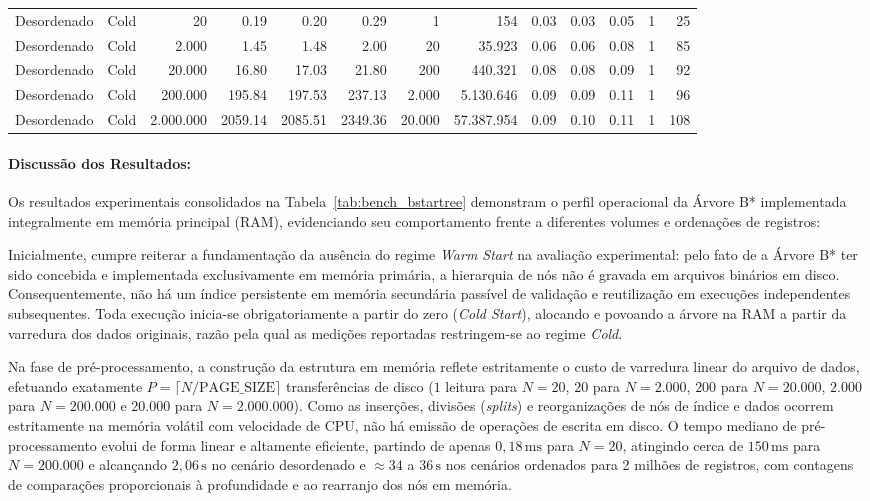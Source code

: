 \documentclass[12pt,a4paper]{article}
\begin{document}
\begin{table}[H]
{\begin{tabular}{llr rrr rr rrr rr}
\midrule
Desordenado & Cold & 20                &    0.19 &    0.20 &    0.29 &     1 &   154 &    0.03 &    0.03 &    0.05 &     1 &    25 \\
Desordenado & Cold & 2.000          &    1.45 &    1.48 &    2.00 &    20 & 35.923 &    0.06 &    0.06 &    0.08 &     1 &    85 \\
Desordenado & Cold & 20.000        &   16.80 &   17.03 &   21.80 &   200 & 440.321 &    0.08 &    0.08 &    0.09 &     1 &    92 \\
Desordenado & Cold & 200.000      &  195.84 &  197.53 &  237.13 & 2.000 & 5.130.646 &    0.09 &    0.09 &    0.11 &     1 &    96 \\
Desordenado & Cold & 2.000.000  & 2059.14 & 2085.51 & 2349.36 & 20.000 & 57.387.954 &    0.09 &    0.10 &    0.11 &     1 &   108 \\
\bottomrule
\end{tabular}%
}
\end{table}

\paragraph{Discussão dos Resultados:}
Os resultados experimentais consolidados na Tabela~\ref{tab:bench_bstartree} demonstram o perfil operacional da Árvore B* implementada integralmente em memória principal (RAM), evidenciando seu comportamento frente a diferentes volumes e ordenações de registros:

Inicialmente, cumpre reiterar a fundamentação da ausência do regime \textit{Warm Start} na avaliação experimental: pelo fato de a Árvore B* ter sido concebida e implementada exclusivamente em memória primária, a hierarquia de nós não é gravada em arquivos binários em disco. Consequentemente, não há um índice persistente em memória secundária passível de validação e reutilização em execuções independentes subsequentes. Toda execução inicia-se obrigatoriamente a partir do zero (\textit{Cold Start}), alocando e povoando a árvore na RAM a partir da varredura dos dados originais, razão pela qual as medições reportadas restringem-se ao regime \textit{Cold}.

Na fase de pré-processamento, a construção da estrutura em memória reflete estritamente o custo de varredura linear do arquivo de dados, efetuando exatamente $P = \lceil N / \text{PAGE\_SIZE} \rceil$ transferências de disco ($1$ leitura para $N=20$, $20$ para $N=2.000$, $200$ para $N=20.000$, $2.000$ para $N=200.000$ e $20.000$ para $N=2.000.000$). Como as inserções, divisões (\textit{splits}) e reorganizações de nós de índice e dados ocorrem estritamente na memória volátil com velocidade de CPU, não há emissão de operações de escrita em disco. O tempo mediano de pré-processamento evolui de forma linear e altamente eficiente, partindo de apenas $0{,}18\,\text{ms}$ para $N=20$, atingindo cerca de $150\,\text{ms}$ para $N=200.000$ e alcançando $2{,}06\,\text{s}$ no cenário desordenado e $\approx 34$ a $36\,\text{s}$ nos cenários ordenados para 2 milhões de registros, com contagens de comparações proporcionais à profundidade e ao rearranjo dos nós em memória.
\end{document}
